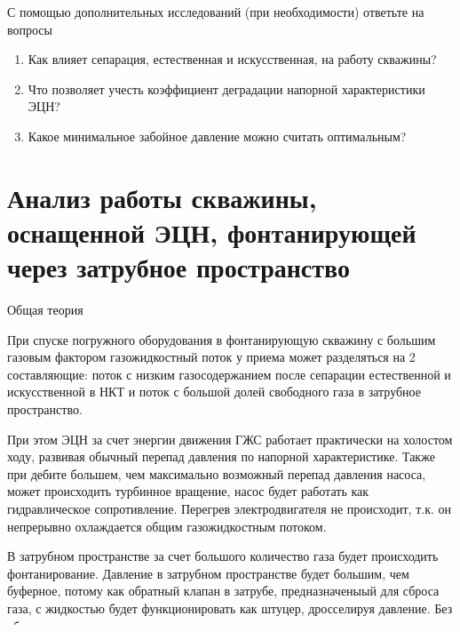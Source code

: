 С помощью дополнительных исследований (при необходимости) ответьте на вопросы

\begin{enumerate}
	\item Как влияет сепарация, естественная и искусственная, на работу скважины?
	\item Что позволяет учесть коэффициент деградации напорной характеристики ЭЦН?
	\item Какое минимальное забойное давление можно считать оптимальным?
\end{enumerate}


\section{Анализ работы скважины, оснащенной ЭЦН, фонтанирующей через затрубное пространство}

Общая теория 

При спуске погружного оборудования в фонтанирующую скважину с большим газовым фактором газожидкостный поток у приема может разделяться на 2 составляющие: поток с низким газосодержанием после сепарации естественной и искусственной в НКТ и поток с большой долей свободного газа в затрубное пространство. 

При этом ЭЦН за счет энергии движения ГЖС работает практически на холостом ходу, развивая обычный перепад давления по напорной характеристике. Также при дебите большем, чем максимально возможный перепад давления  насоса, может происходить турбинное вращение, насос будет работать как гидравлическое сопротивление. Перегрев электродвигателя не происходит, т.к. он непрерывно охлаждается общим газожидкостным потоком.

В затрубном пространстве за счет большого количество газа будет происходить фонтанирование. Давление в затрубном пространстве будет большим, чем буферное, потому как обратный клапан в затрубе, предназначеныый для сброса газа, с жидкостью будет функционировать как штуцер, дросселируя давление. Без обратного клапана можно сделать  логичное предположение о том, что давления будут равными - газлифтный эффект в затрубном пространстве (подъем газожидкостной смеси за счет снижения плотности) будет равен перепаду давления, который создает ЭЦН.

Отсюда возникает вопрос, рационально ли устанавливать ЭЦН в фонтанирующую скважину с большим газовым фактором?

В данном упражнении предлагается смоделировать данный процесс. Но Вы также можете просмотреть расширенный расчет реальной скважины в папке "аpp".

